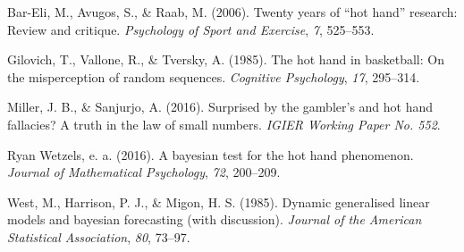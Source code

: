 \documentclass[12pt,twoside]{dukestatscithesis}
\theoremstyle{definition}
\theoremstyle{definition}
\theoremstyle{definition}
\theoremstyle{remark}
\begin{document}
\hypertarget{ref-bareli06}{}
Bar-Eli, M., Avugos, S., \& Raab, M. (2006). Twenty years of ``hot
hand'' research: Review and critique. \emph{Psychology of Sport and
Exercise}, \emph{7}, 525--553.

\hypertarget{ref-gilovich85}{}
Gilovich, T., Vallone, R., \& Tversky, A. (1985). The hot hand in
basketball: On the misperception of random sequences. \emph{Cognitive
Psychology}, \emph{17}, 295--314.

\hypertarget{ref-miller16}{}
Miller, J. B., \& Sanjurjo, A. (2016). Surprised by the gambler's and
hot hand fallacies? A truth in the law of small numbers. \emph{IGIER
Working Paper No. 552}.

\hypertarget{ref-wetzels16}{}
Ryan Wetzels, e. a. (2016). A bayesian test for the hot hand phenomenon.
\emph{Journal of Mathematical Psychology}, \emph{72}, 200--209.

\hypertarget{ref-west85}{}
West, M., Harrison, P. J., \& Migon, H. S. (1985). Dynamic generalised
linear models and bayesian forecasting (with discussion). \emph{Journal
of the American Statistical Association}, \emph{80}, 73--97.


\end{document}
